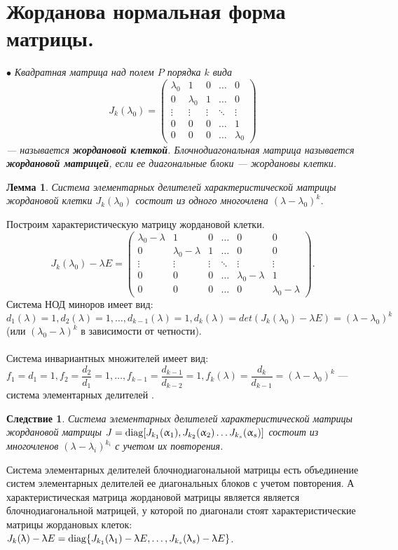 \section{Жорданова нормальная форма матрицы.}
$\bullet$ \textit{Квадратная матрица над полем $P$ порядка $k$ вида}
$$J_k(\lambda_0) = \begin{pmatrix}
	\lambda_0 & 1 & 0 & \dots & 0 \\
	0 & \lambda_0 & 1 & \dots & 0 \\
	\vdots & \vdots & \vdots & \ddots & \vdots\\
	0 & 0 & 0 & \dots & 1 \\
	0 & 0 & 0 & \dots & \lambda_0 \end{pmatrix} 
$$ \textit{--- называется \textbf{жордановой клеткой}. Блочнодиагональная матрица называется \textbf{жордановой матрицей}, если ее диагональные блоки --- жордановы клетки.}
\newtheorem*{lem12_8_1}{Лемма}\begin{lem12_8_1} Система элементарных делителей характеристической матрицы жордановой клетки $J_k(\lambda_0)$ состоит из одного многочлена $(\lambda - \lambda_0) ^ k$.
\end{lem12_8_1}\begin{Proof}Построим характеристическую матрицу жордановой клетки.
	$$J_k(\lambda_0) - \lambda E = \begin{pmatrix} \lambda_0 - \lambda & 1 & 0 & \dots & 0 & 0 \\ 
		0 & \lambda_0 - \lambda & 1 & \dots & 0 & 0 \\ 
		\vdots & \vdots & \vdots & \ddots & \vdots & \vdots\\ 0 & 0 & 0 & \dots & \lambda_0 - \lambda & 1 \\ 0 & 0 & 0 & \dots & 0 & \lambda_0 - \lambda \end{pmatrix}.$$
	Система НОД миноров имеет вид: $d_1(\lambda) = 1, d_2(\lambda) = 1,\dots, d_{k-1}(\lambda) = 1, d_k(\lambda) =det(J_k(\lambda_0) - \lambda E)= (\lambda - \lambda_0)^k$ (или $(\lambda_0 - \lambda)^k$ в зависимости от четности).\\\\
	Система инвариантных множителей имеет вид: $f_1 = d_1 = 1, f_2 = \dfrac{d_2}{d_1} = 1,\dots, f_{k-1}=\dfrac{d_{k-1}}{d_{k-2}} = 1, f_k(\lambda) = \dfrac{d_{k}}{d_{k-1}} = (\lambda - \lambda_0)^k$ --- система элементарных делителей	.
\end{Proof}
\newtheorem*{cor12_8_2}{Следствие}\begin{cor12_8_2}Система элементарных делителей характеристической матрицы жордановой матрицы $J = \operatorname{diag} [J_{k_1}(\upalpha_1), J_{k_2}(\upalpha_2) \dots J_{k_s}(\upalpha_s)]$ состоит из многочленов $(\lambda - \lambda_i)^{k_i}$ с учетом их повторения.
\end{cor12_8_2}\begin{Proof}
	Система элементарных делителей блочнодиагональной матрицы есть объединение систем элементарных делителей ее диагональных блоков с учетом повторения. А характеристическая матрица жордановой матрицы является является блочнодиагональной матрицей, у которой по диагонали стоят характеристические матрицы жордановых клеток: $J_k(\uplambda) - \uplambda E = \operatorname{diag} \{J_{k_1}(\uplambda_1)-\uplambda E,\dots,J_{k_s}(\uplambda_s)-\uplambda E \}$.
\end{Proof}
